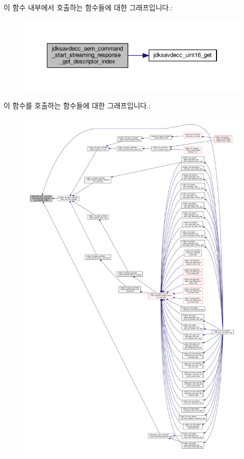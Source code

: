 이 함수 내부에서 호출하는 함수들에 대한 그래프입니다.\+:
\nopagebreak
\begin{figure}[H]
\begin{center}
\leavevmode
\includegraphics[width=350pt]{group__command__start__streaming__response_ga5d4e2d26cf8b8a6301bf06db86c020c8_cgraph}
\end{center}
\end{figure}




이 함수를 호출하는 함수들에 대한 그래프입니다.\+:
\nopagebreak
\begin{figure}[H]
\begin{center}
\leavevmode
\includegraphics[width=350pt]{group__command__start__streaming__response_ga5d4e2d26cf8b8a6301bf06db86c020c8_icgraph}
\end{center}
\end{figure}


